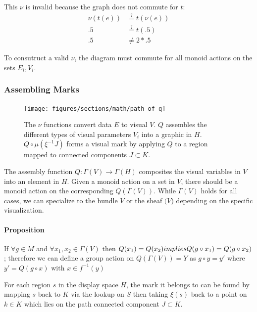\documentclass[../main.tex]{subfiles}
\begin{document}
This $\nu$ is invalid because the graph does not commute for $t$:
\begin{align}
    \nu(t(e)) & \overset{?}{=} t(\nu(e))\\
    .5 & \overset{?}{=} t(.5)\\
    .5 & \neq 2*.5
\end{align}

To consutruct a valid $\nu$, the diagram must commute for all monoid actions on the sets $E_i, V_i$.


\subsubsection{Assembling Marks}
\begin{figure}[H]
    \texttt{[image: figures/sections/math/path\_of\_q]}
    \label{fig:q}
    \caption{The $\nu$ functions convert data $E$ to visual $V$. $Q$ assembles the different types of visual parameters $V_{i}$ into a graphic in $H$. $Q\circ\mu(\xi^{-1}J)$ forms a visual mark by applying $Q$ to a region mapped to connected components $J \subset K$.}  
\end{figure}

The assembly function $Q: \Gamma(V) \rightarrow \Gamma(H)$ composites the visual variables in $V$ into an element in $H$. Given a monoid action on a set in $V$, there should be a monoid action on the corresponding $Q(\Gamma(V))$. While $\Gamma(V)$ holds for all cases, we can specialize to the bundle $V$ or the sheaf $\mathcal(V)$ depending on the specific visualization. 

\paragraph{Proposition}
If $\forall g \in M$ and $\forall x_1, x_2 \in \Gamma(V)$ then  $Q(x_1) = Q(x_2) \\implies Q(g\circ x_1) = Q(g\circ x_2)$; therefore we can define a group action on $Q(\Gamma(V))=Y$ as $g \circ y = y'$ where $y' = Q(g\circ x)$ with $x \in f^{-1}(y)$ 


For each region $s$ in the display space $H$, the mark  \cite{bertinIIPropertiesGraphic2011,carpendaleVisualRepresentationSemiology} it belongs to can be found by mapping $s$ back to $K$ via the lookup on $S$ then taking $\xi(s)$ back to a point on $k \in K$ which lies on the path connected component $J \subset K$. 
\end{document}
